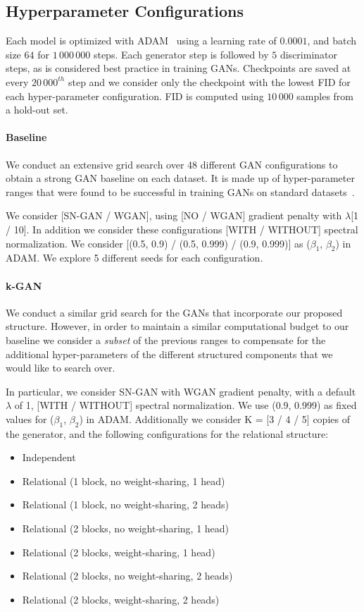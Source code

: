 \documentclass{article}
\begin{document}
\subsection{Hyperparameter Configurations}
Each model is optimized with ADAM~\citep{kingma2015adam} using a learning rate of $0.0001$, and batch size $64$ for $1\,000\,000$ steps.
Each generator step is followed by $5$ discriminator steps, as is considered best practice in training GANs.
Checkpoints are saved at every $20\,000^{th}$ step and we consider only the checkpoint with the lowest FID for each hyper-parameter configuration.
FID is computed using $10\,000$ samples from a hold-out set.

\paragraph{Baseline}
We conduct an extensive grid search over 48 different GAN configurations to obtain a strong GAN baseline on each dataset.
It is made up of hyper-parameter ranges that were found to be successful in training GANs on standard datasets~\citep{kurach2018gan}. 

We consider [SN-GAN / WGAN], using [NO / WGAN] gradient penalty with $\lambda$[1 / 10].
In addition we consider these configurations [WITH / WITHOUT] spectral normalization.
We consider [(0.5, 0.9) / (0.5, 0.999) / (0.9, 0.999)] as ($\beta_1$, $\beta_2$) in ADAM.
We explore 5 different seeds for each configuration.

\paragraph{k-GAN}
We conduct a similar grid search for the GANs that incorporate our proposed structure. 
However, in order to maintain a similar computational budget to our baseline we consider a \emph{subset} of the previous ranges to compensate for the additional hyper-parameters of the different structured components that we would like to search over.

In particular, we consider SN-GAN with WGAN gradient penalty, with a default $\lambda$ of 1, [WITH / WITHOUT] spectral normalization.
We use (0.9, 0.999) as fixed values for ($\beta_1$, $\beta_2$) in ADAM.
Additionally we consider K = [3 / 4 / 5] copies of the generator, and the following configurations for the relational structure:

\begin{itemize}
    \item Independent
    \item Relational (1 block, no weight-sharing, 1 head)
    \item Relational (1 block, no weight-sharing, 2 heads)
    \item Relational (2 blocks, no weight-sharing, 1 head)
    \item Relational (2 blocks, weight-sharing, 1 head)
    \item Relational (2 blocks, no weight-sharing, 2 heads)
    \item Relational (2 blocks, weight-sharing, 2 heads)
\end{itemize}
\end{document}
